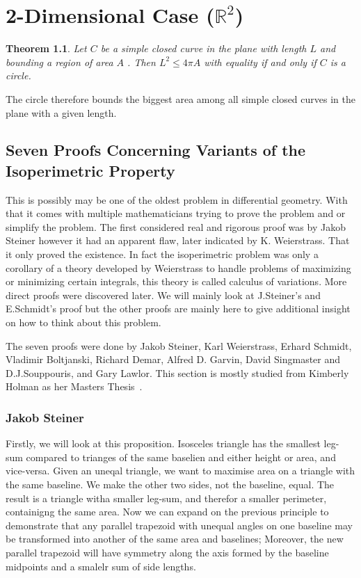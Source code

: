 \documentclass[a4paper]{book}
\newtheorem{theorem}{Theorem}%
\begin{document}
\chapter{2-Dimensional Case ($\mathbb{R}^2$)}
\begin{theorem}
    Let $C$ be a simple closed curve in the plane with length $L$ and bounding a region of area $A$ . 
    Then $L^2 \leq 4\pi A$ with equality if and only if $C$ is a circle.
\end{theorem}
The circle therefore bounds the biggest area among all simple closed curves in the plane with a given length.

\section{Seven Proofs Concerning Variants of the Isoperimetric Property}
This is possibly may be one of the oldest problem in differential geometry. With that it comes with multiple mathematicians trying to prove the problem and or simplify the problem. The first considered real and rigorous proof was by Jakob Steiner however it had an apparent flaw, later indicated by K. Weierstrass. That it only proved the existence. In fact the isoperimetric problem was only a corollary of a theory developed by Weierstrass to handle problems of maximizing or minimizing certain integrals, this theory is called calculus of variations. More direct proofs were discovered later. We will mainly look at J.Steiner's and E.Schmidt's proof but the other proofs are mainly here to give additional insight on how to think about this problem. 

The seven proofs were done by Jakob Steiner, Karl Weierstrass, Erhard Schmidt, Vladimir Boltjanski, Richard Demar, Alfred D. Garvin, David Singmaster and D.J.Souppouris, and Gary Lawlor. This section is mostly studied from Kimberly Holman as her Masters Thesis~\cite{holman2022isoperimetric}.

\subsection{Jakob Steiner}
Firstly, we will look at this proposition. Isosceles triangle has the smallest leg-sum compared to trianges of the same baselien and either height or area, and vice-versa. Given an uneqal triangle, we want to maximise area on a triangle with the same baseline. We make the other two sides, not the baseline, equal. The result is a triangle witha smaller leg-sum, and therefor a smaller perimeter, containigng the same area. Now we can expand on the previous principle to demonstrate that any parallel trapezoid with unequal angles on one baseline may be transformed into another of the same area and baselines; Moreover, the new parallel trapezoid will have symmetry along the axis formed by the baseline midpoints and a smalelr sum of side lengths.
\end{document}
